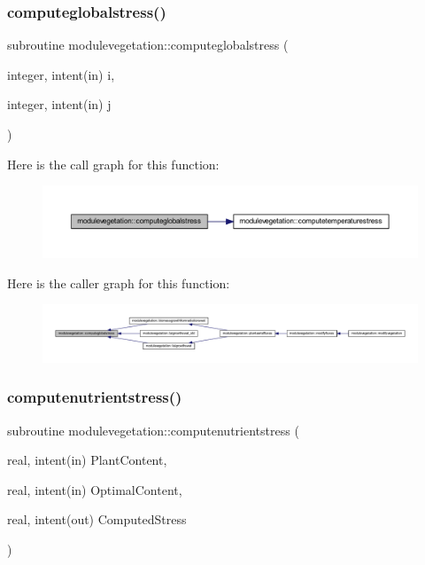 \subsubsection{\texorpdfstring{computeglobalstress()}{computeglobalstress()}}
{\footnotesize\ttfamily subroutine modulevegetation\+::computeglobalstress (\begin{DoxyParamCaption}\item[{integer, intent(in)}]{i,  }\item[{integer, intent(in)}]{j }\end{DoxyParamCaption})\hspace{0.3cm}{\ttfamily [private]}}

Here is the call graph for this function\+:\nopagebreak
\begin{figure}[H]
\begin{center}
\leavevmode
\includegraphics[width=350pt]{namespacemodulevegetation_a9bed5257328690b46cde01cfe91f313a_cgraph}
\end{center}
\end{figure}
Here is the caller graph for this function\+:\nopagebreak
\begin{figure}[H]
\begin{center}
\leavevmode
\includegraphics[width=350pt]{namespacemodulevegetation_a9bed5257328690b46cde01cfe91f313a_icgraph}
\end{center}
\end{figure}
\mbox{\label{namespacemodulevegetation_abdb0b0a9e6c19d706d25ff42b84611d2}} 
\subsubsection{\texorpdfstring{computenutrientstress()}{computenutrientstress()}}
{\footnotesize\ttfamily subroutine modulevegetation\+::computenutrientstress (\begin{DoxyParamCaption}\item[{real, intent(in)}]{Plant\+Content,  }\item[{real, intent(in)}]{Optimal\+Content,  }\item[{real, intent(out)}]{Computed\+Stress }\end{DoxyParamCaption})\hspace{0.3cm}{\ttfamily [private]}}

